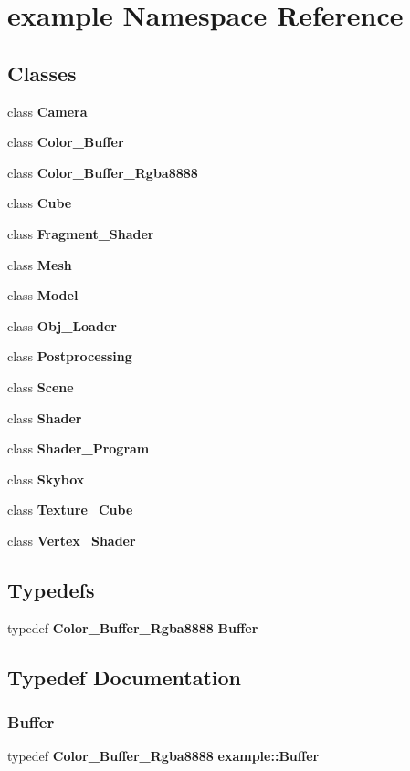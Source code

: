 \section{example Namespace Reference}
\label{namespaceexample}
\subsection*{Classes}
\begin{DoxyCompactItemize}
\item 
class \textbf{ Camera}
\item 
class \textbf{ Color\+\_\+\+Buffer}
\item 
class \textbf{ Color\+\_\+\+Buffer\+\_\+\+Rgba8888}
\item 
class \textbf{ Cube}
\item 
class \textbf{ Fragment\+\_\+\+Shader}
\item 
class \textbf{ Mesh}
\item 
class \textbf{ Model}
\item 
class \textbf{ Obj\+\_\+\+Loader}
\item 
class \textbf{ Postprocessing}
\item 
class \textbf{ Scene}
\item 
class \textbf{ Shader}
\item 
class \textbf{ Shader\+\_\+\+Program}
\item 
class \textbf{ Skybox}
\item 
class \textbf{ Texture\+\_\+\+Cube}
\item 
class \textbf{ Vertex\+\_\+\+Shader}
\end{DoxyCompactItemize}
\subsection*{Typedefs}
\begin{DoxyCompactItemize}
\item 
typedef \textbf{ Color\+\_\+\+Buffer\+\_\+\+Rgba8888} \textbf{ Buffer}
\end{DoxyCompactItemize}


\subsection{Typedef Documentation}
\mbox{\label{namespaceexample_ac788f11d410cec0ba7baffc633d98a4a}} 
\subsubsection{Buffer}
{\footnotesize\ttfamily typedef \textbf{ Color\+\_\+\+Buffer\+\_\+\+Rgba8888} \textbf{ example\+::\+Buffer}}

